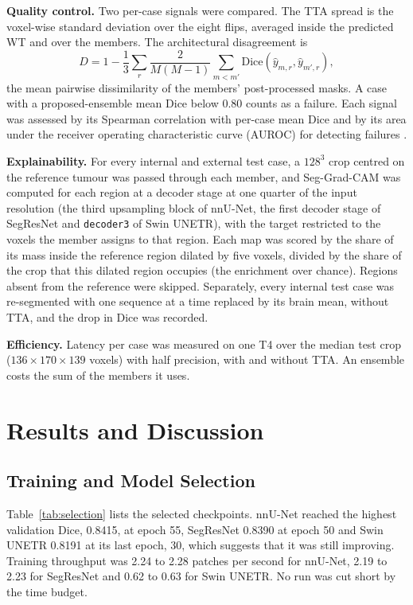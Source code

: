 \documentclass[a4paper,fleqn]{cas-sc}
\begin{document}
\textbf{Quality control.} Two per-case signals were compared. The TTA spread is the voxel-wise standard deviation over the eight flips, averaged inside the predicted WT and over the members. The architectural disagreement is
\begin{equation}
D=1-\frac{1}{3}\sum_{r}\frac{2}{M(M-1)}\sum_{m<m'}\mathrm{Dice}\!\left(\hat{y}_{m,r},\hat{y}_{m',r}\right),
\label{eq:disagreement}
\end{equation}
the mean pairwise dissimilarity of the members' post-processed masks. A case with a proposed-ensemble mean Dice below 0.80 counts as a failure. Each signal was assessed by its Spearman correlation with per-case mean Dice \citep{spearman1904} and by its area under the receiver operating characteristic curve (AUROC) for detecting failures \citep{hanley1982}.

\textbf{Explainability.} For every internal and external test case, a $128^3$ crop centred on the reference tumour was passed through each member, and Seg-Grad-CAM \citep{vinogradova2020} was computed for each region at a decoder stage at one quarter of the input resolution (the third upsampling block of nnU-Net, the first decoder stage of SegResNet and \texttt{decoder3} of Swin UNETR), with the target restricted to the voxels the member assigns to that region. Each map was scored by the share of its mass inside the reference region dilated by five voxels, divided by the share of the crop that this dilated region occupies (the enrichment over chance). Regions absent from the reference were skipped. Separately, every internal test case was re-segmented with one sequence at a time replaced by its brain mean, without TTA, and the drop in Dice was recorded.

\textbf{Efficiency.} Latency per case was measured on one T4 over the median test crop ($136\times 170\times 139$ voxels) with half precision, with and without TTA. An ensemble costs the sum of the members it uses.

\section{Results and Discussion}
\label{sec:results}

\subsection{Training and Model Selection}
\label{sec:selection}

Table~\ref{tab:selection} lists the selected checkpoints. nnU-Net reached the highest validation Dice, 0.8415, at epoch 55, SegResNet 0.8390 at epoch 50 and Swin UNETR 0.8191 at its last epoch, 30, which suggests that it was still improving. Training throughput was 2.24 to 2.28 patches per second for nnU-Net, 2.19 to 2.23 for SegResNet and 0.62 to 0.63 for Swin UNETR. No run was cut short by the time budget.
\end{document}
